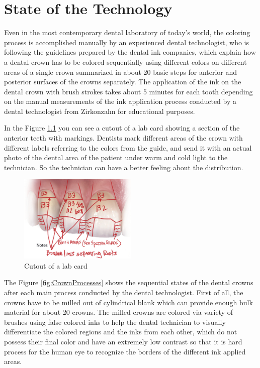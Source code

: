 \chapter{State of the Technology}
\label{sec:stand_technik}
Even in the most contemporary dental laboratory of today's world, the coloring process is accomplished manually by an experienced dental technologist, who is following the guidelines prepared by the dental ink companies, which explain how a dental crown has to be colored sequentially using different colors on different areas of a single crown summarized in about 20 basic steps for anterior and posterior surfaces of the crowns separately\citep{idscad2016}. The application of the ink on the dental crown with brush strokes takes about 5 minutes for each tooth depending on the manual measurements of the ink application process conducted by a dental technologist from Zirkonzahn for educational purposes.

In the Figure \ref{fig:lab_card} you can see a cutout of a lab card showing a section of the anterior teeth with markings. Dentists mark different areas of the crown with different labels referring to the colors from the guide, and send it  with an actual photo of the dental area of the patient under warm and cold light to the technician. So the technician can have a better feeling about the distribution.
\bigskip
\begin{figure}[h]
	\centering
	\includegraphics[width=0.5\textwidth]{grafiken/lab_card.png}
			\caption{Cutout of a lab card \citep{sharpling2014}}
	\label{fig:lab_card}
\end{figure}
\bigskip
The Figure \ref{fig:CrownProcesses} shows the sequential states of the dental crowns after each main process conducted by the dental technologist. First of all, the crowns have to be milled out of cylindrical blank which can provide enough bulk material for about 20 crowns. The milled crowns are colored via variety of brushes using  false colored inks to help the dental technician to visually differentiate the colored regions and the inks from each other, which do not possess their final color and have an extremely low contrast so that it is hard process for the human eye to recognize the borders of the different ink applied areas.

